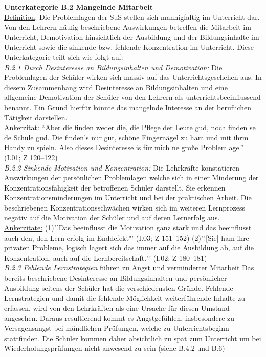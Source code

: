 \textbf{Unterkategorie B.2 Mangelnde Mitarbeit }\\
\underline{Definition}: Die Problemlagen der SuS stellen sich mannigfaltig im Unterricht dar. Von den Lehrern häufig beschriebene Auswirkungen betreffen die Mitarbeit im Unterricht, Demotivation hinsichtlich der Ausbildung und der Bildungsinhalte im Unterricht sowie die sinkende bzw. fehlende Konzentration im Unterricht. Diese Unterkategorie teilt sich wie folgt auf:\\
\textit{B.2.1 Durch Desinteresse an Bildungsinhalten und Demotivation:} Die Problemlagen der Schüler wirken sich massiv auf das Unterrichtsgeschehen aus. In diesem Zusammenhang wird Desinteresse an Bildungsinhalten und eine allgemeine Demotivation der Schüler von den Lehrern als unterrichtsbeeinflussend benannt. Ein Grund hierfür könnte das mangelnde Interesse an der beruflichen Tätigkeit darstellen.\\
\underline{Ankerzitat:} "`Aber die finden weder die, die Pflege der Leute gud, noch finden se de Schule gud. Die finden’s nur gut, schöne Fingernägel zu ham und mit ihrm Handy zu spieln. Also dieses Desinteresse is für mich ne große Problemlage."' (I.01; Z 120--122)\\
\textit{B.2.2  Sinkende Motivation und Konzentration:} Die Lehrkräfte konstatieren Auswirkungen der persönlichen Problemlagen welche sich in einer Minderung der Konzentrationsfähigkeit der betroffenen Schüler darstellt. Sie erkennen Konzentrationsminderungen im Unterricht und bei der praktischen Arbeit. Die beschriebenen Konzentrationsschwächen wirken sich im weiteren Lernprozess negativ auf die Motivation der Schüler und auf deren Lernerfolg aus.\\
\underline{Ankerzitate:} (1)"'Das beeinflusst die Motivation ganz stark und das beeinflusst auch den, den Lern-erfolg im Enddefekt"' (I.03; Z 151--152) (2)"'[Sie] ham ihre privaten Probleme, logisch lagert sich das immer auf die Ausbildung ab, auf die Konzentration, auch auf die Lernbereitschaft."' (I.02; Z 180--181)\\
\textit{B.2.3 Fehlende Lernstrategien} führen zu Angst und verminderter Mitarbeit Das bereits beschriebene Desinteresse an Bildungsinhalten und persönlicher Ausbildung seitens der Schüler hat die verschiedensten Gründe. Fehlende Lernstrategien und damit die fehlende Möglichkeit weiterführende Inhalte zu erfassen, wird von den Lehrkräften als eine Ursache für diesen Umstand angesehen. Daraus resultierend kommt es Angstgefühlen, insbesondere zu Versagensangst bei mündlichen Prüfungen, welche zu Unterrichtsbeginn stattfinden. Die Schüler kommen daher absichtlich zu spät zum Unterricht um bei Wiederholungsprüfungen nicht anwesend zu sein (siehe B.4.2 und B.6)\\
